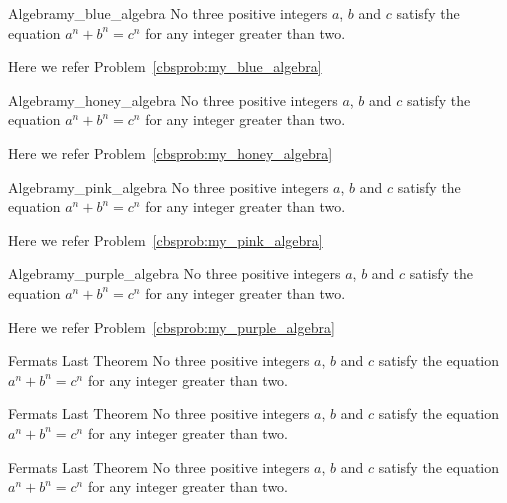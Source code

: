 \documentclass[11pt, letterpaper]{../src/exercise}
\begin{document}
    \begin{cbblueproblem}{Algebra}{my_blue_algebra}
    No three positive integers \(a\), \(b\) and \(c\) satisfy the equation
    \(a^{n} + b^{n} = c^{n}\) for any integer greater than two.
    \end{cbblueproblem}
    Here we refer Problem~\ref{cbsprob:my_blue_algebra}%

    \begin{cbhoneyproblem}{Algebra}{my_honey_algebra}
    No three positive integers \(a\), \(b\) and \(c\) satisfy the equation
    \(a^{n} + b^{n} = c^{n}\) for any integer greater than two.
    \end{cbhoneyproblem}
    Here we refer Problem~\ref{cbsprob:my_honey_algebra}%

    \begin{cbpinkproblem}{Algebra}{my_pink_algebra}
    No three positive integers \(a\), \(b\) and \(c\) satisfy the equation
    \(a^{n} + b^{n} = c^{n}\) for any integer greater than two.
    \end{cbpinkproblem}
    Here we refer Problem~\ref{cbsprob:my_pink_algebra}%

    \begin{cbpurpleproblem}{Algebra}{my_purple_algebra}
    No three positive integers \(a\), \(b\) and \(c\) satisfy the equation
    \(a^{n} + b^{n} = c^{n}\) for any integer greater than two.
    \end{cbpurpleproblem}
    Here we refer Problem~\ref{cbsprob:my_purple_algebra}%

    \begin{cbbred}{Fermats Last Theorem}
    No three positive integers \(a\), \(b\) and \(c\) satisfy the equation
    \(a^{n} + b^{n} = c^{n}\) for any integer greater than two.
    \end{cbbred}

    \begin{cbbgreen}{Fermats Last Theorem}
    No three positive integers \(a\), \(b\) and \(c\) satisfy the equation
    \(a^{n} + b^{n} = c^{n}\) for any integer greater than two.
    \end{cbbgreen}

    \begin{cbbblue}{Fermats Last Theorem}
    No three positive integers \(a\), \(b\) and \(c\) satisfy the equation
    \(a^{n} + b^{n} = c^{n}\) for any integer greater than two.
    \end{cbbblue}
\end{document}
